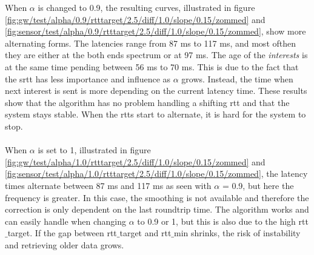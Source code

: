When $\alpha$ is changed to 0.9, the resulting curves, illustrated in figure \ref{fig:gw/test/alpha/0.9/rtttarget/2.5/diff/1.0/slope/0.15/zommed} and \ref{fig:sensor/test/alpha/0.9/rtttarget/2.5/diff/1.0/slope/0.15/zommed}, show more alternating forms. The latencies range from 87 ms to 117 ms, and most ofthen they are either at the both ends spectrum or at 97 ms. The age of the \textit{interests} is at the same time pending between 56 ms to 70 ms. This is due to the fact that the srtt has less importance and influence as $\alpha$ grows. Instead, the time when next interest is sent is more depending on the current latency time. 
These results show that the algorithm has no problem handling a shifting rtt and that the system stays stable. When the rtts start to alternate, it is hard for the system to stop.\\\\
When $\alpha$ is set to 1, illustrated in figure \ref{fig:gw/test/alpha/1.0/rtttarget/2.5/diff/1.0/slope/0.15/zommed} and \ref{fig:sensor/test/alpha/1.0/rtttarget/2.5/diff/1.0/slope/0.15/zommed}, the latency times alternate between 87 ms and 117 ms as seen with $\alpha$ = 0.9, but here the frequency is greater. In this case, the smoothing is not available and therefore the correction is only dependent on the last roundtrip time. The algorithm works and can easily handle when changing $\alpha$ to 0.9 or 1, but this is also due to the high rtt$\_$target.  If the gap between rtt$\_$target and rtt$\_$min shrinks, the risk of instability and retrieving older data grows.

